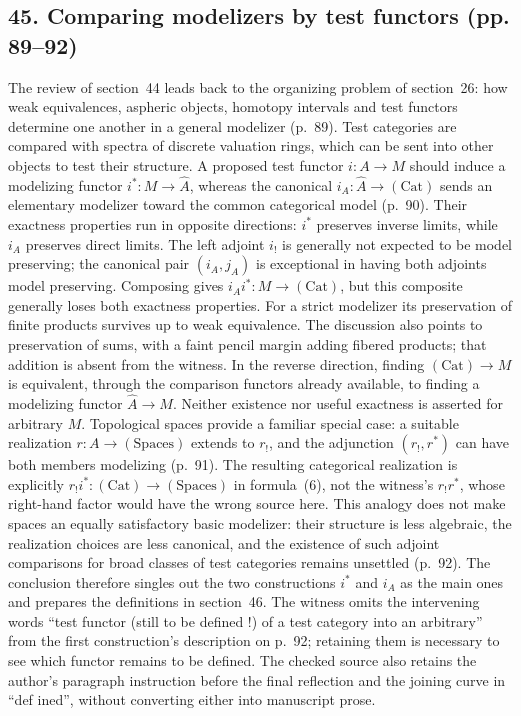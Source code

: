 \documentclass[10pt,oneside]{book}
\begin{document}
\subsection*{45. Comparing modelizers by test functors (pp. 89--92)}
The review of section~44 leads back to the organizing problem of section~26: how weak equivalences, aspheric objects, homotopy intervals and test functors determine one another in a general modelizer (p.~89). Test categories are compared with spectra of discrete valuation rings, which can be sent into other objects to test their structure. A proposed test functor $i:A\to M$ should induce a modelizing functor $i^*:M\to\widehat A$, whereas the canonical $i_A:\widehat A\to(\mathrm{Cat})$ sends an elementary modelizer toward the common categorical model (p.~90). Their exactness properties run in opposite directions: $i^*$ preserves inverse limits, while $i_A$ preserves direct limits. The left adjoint $i_!$ is generally not expected to be model preserving; the canonical pair $(i_A,j_A)$ is exceptional in having both adjoints model preserving. Composing gives $i_Ai^*:M\to(\mathrm{Cat})$, but this composite generally loses both exactness properties. For a strict modelizer its preservation of finite products survives up to weak equivalence. The discussion also points to preservation of sums, with a faint pencil margin adding fibered products; that addition is absent from the witness. In the reverse direction, finding $(\mathrm{Cat})\to M$ is equivalent, through the comparison functors already available, to finding a modelizing functor $\widehat A\to M$. Neither existence nor useful exactness is asserted for arbitrary $M$. Topological spaces provide a familiar special case: a suitable realization $r:A\to(\mathrm{Spaces})$ extends to $r_!$, and the adjunction $(r_!,r^*)$ can have both members modelizing (p.~91). The resulting categorical realization is explicitly $r_!i^*:(\mathrm{Cat})\to(\mathrm{Spaces})$ in formula~(6), not the witness's $r_!r^*$, whose right-hand factor would have the wrong source here. This analogy does not make spaces an equally satisfactory basic modelizer: their structure is less algebraic, the realization choices are less canonical, and the existence of such adjoint comparisons for broad classes of test categories remains unsettled (p.~92). The conclusion therefore singles out the two constructions $i^*$ and $i_A$ as the main ones and prepares the definitions in section~46. The witness omits the intervening words ``test functor (still to be defined !) of a test category into an arbitrary'' from the first construction's description on p.~92; retaining them is necessary to see which functor remains to be defined. The checked source also retains the author's paragraph instruction before the final reflection and the joining curve in ``def ined'', without converting either into manuscript prose.
\end{document}
